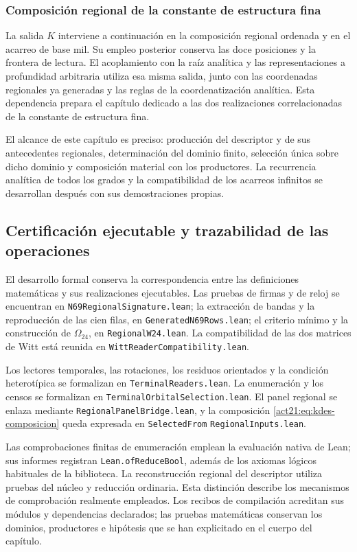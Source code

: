 \subsubsection{Composición regional de la constante de estructura fina}

La salida $K$ interviene a continuación en la composición regional
ordenada y en el acarreo de base mil. Su empleo posterior conserva las
doce posiciones y la frontera de lectura. El acoplamiento con la raíz
analítica y las representaciones a profundidad arbitraria utiliza esa
misma salida, junto con las coordenadas regionales ya generadas y las
reglas de la coordenatización analítica. Esta dependencia prepara el capítulo
dedicado a las dos realizaciones correlacionadas de la constante de
estructura fina.

El alcance de este capítulo es preciso: producción del descriptor y
de sus antecedentes regionales, determinación del dominio finito,
selección única sobre dicho dominio y composición material con los
productores. La recurrencia analítica de todos los grados y la
compatibilidad de los acarreos infinitos se desarrollan después con sus
demostraciones propias.

\subsection{Certificación ejecutable y trazabilidad de las operaciones}

El desarrollo formal conserva la correspondencia entre las
definiciones matemáticas y sus realizaciones ejecutables. Las pruebas
de firmas y de reloj se encuentran en
\texttt{N69RegionalSignature.lean}; la extracción de bandas y la
reproducción de las cien filas, en
\texttt{GeneratedN69Rows.lean}; el criterio mínimo y la construcción
de $\Omega_{24}$, en \texttt{RegionalW24.lean}. La compatibilidad de
las dos matrices de Witt está reunida en
\texttt{WittReaderCompatibility.lean}.

Los lectores temporales, las rotaciones, los residuos orientados y la
condición heterotípica se formalizan en
\texttt{TerminalReaders.lean}. La enumeración y los censos se
formalizan en \texttt{Terminal}\allowbreak\texttt{Orbital}\allowbreak\texttt{Selection.lean}. El panel
regional se enlaza mediante \texttt{Regional}\allowbreak\texttt{Panel}\allowbreak\texttt{Bridge.lean}, y la
composición \eqref{act21:eq:kdes-composicion} queda expresada en
\texttt{Selected}\allowbreak\texttt{From}\allowbreak%
\texttt{Regional}\allowbreak\texttt{Inputs.lean}.

Las comprobaciones finitas de enumeración emplean la evaluación nativa
de Lean; sus informes registran \texttt{Lean.ofReduceBool}, además
de los axiomas lógicos habituales de la biblioteca. La reconstrucción
regional del descriptor utiliza pruebas del núcleo y reducción
ordinaria. Esta distinción describe los mecanismos de comprobación
realmente empleados. Los recibos de compilación acreditan sus módulos
y dependencias declarados; las pruebas matemáticas conservan los
dominios, productores e hipótesis que se han explicitado en el cuerpo
del capítulo.
